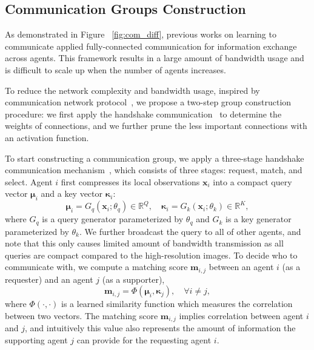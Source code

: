 \subsection{Communication Groups Construction}

As demonstrated in Figure ~\ref{fig:com_diff}, previous works on learning to communicate applied fully-connected communication for information exchange across agents. This framework results in a large amount of bandwidth usage and is difficult to scale up when the number of agents increases. 

To reduce the network complexity and bandwidth usage, inspired by communication network protocol~\cite{kurose2005computer}, we propose a two-step group construction procedure: we first apply the handshake communication~\cite{liu2020who2com} to determine the weights of connections, and we further prune the less important connections with an activation function.  

To start constructing a communication group, we apply a three-stage handshake communication mechanism~\cite{liu2020who2com}, which consists of three stages: request, match, and select. Agent $i$ first compresses its local observations $\bm{x}_i$ into a compact query vector $\bm{\mu}_i$ and a key vector $\bm{\kappa}_i$:
\begin{equation}\label{eq:key_query_generator}
     \bm{\mu}_i = G_q(\bm{x}_i; \theta_q)\in\mathbb{R}^Q, \quad \bm{\kappa}_i = G_k(\bm{x}_i;\theta_k)\in\mathbb{R}^K,
\end{equation}
where $G_q$ is a query generator parameterized by $\theta_q$ and $G_k$ is a key generator parameterized by $\theta_k$. We further broadcast the query to all of other agents, and note that this only causes limited amount of bandwidth transmission as all queries are compact compared to the high-resolution images. To decide who to communicate with, we compute a matching score $\bm{m}_{i,j}$ between an agent $i$ (as a requester) and an agent $j$ (as a supporter),
\begin{equation}\label{eq:matching}
    \bm{m}_{i,j} = \Phi(\bm{\mu}_i, \bm{\kappa}_j), \quad \forall i\neq j,
\end{equation}
where $\Phi(\cdot,\cdot)$ is a learned similarity function which measures the correlation between two vectors. The matching score $\bm{m}_{i,j}$ implies correlation between agent $i$ and $j$, and intuitively this value also represents the amount of information the supporting agent $j$ can provide for the requesting agent $i$. 

